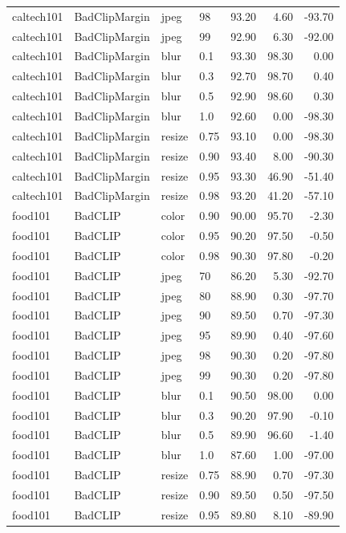 \begin{tabular}{llllrrr}
caltech101 & BadClipMargin & jpeg & 98 & 93.20 & 4.60 & -93.70 \\
caltech101 & BadClipMargin & jpeg & 99 & 92.90 & 6.30 & -92.00 \\
caltech101 & BadClipMargin & blur & 0.1 & 93.30 & 98.30 & 0.00 \\
caltech101 & BadClipMargin & blur & 0.3 & 92.70 & 98.70 & 0.40 \\
caltech101 & BadClipMargin & blur & 0.5 & 92.90 & 98.60 & 0.30 \\
caltech101 & BadClipMargin & blur & 1.0 & 92.60 & 0.00 & -98.30 \\
caltech101 & BadClipMargin & resize & 0.75 & 93.10 & 0.00 & -98.30 \\
caltech101 & BadClipMargin & resize & 0.90 & 93.40 & 8.00 & -90.30 \\
caltech101 & BadClipMargin & resize & 0.95 & 93.30 & 46.90 & -51.40 \\
caltech101 & BadClipMargin & resize & 0.98 & 93.20 & 41.20 & -57.10 \\
food101 & BadCLIP & color & 0.90 & 90.00 & 95.70 & -2.30 \\
food101 & BadCLIP & color & 0.95 & 90.20 & 97.50 & -0.50 \\
food101 & BadCLIP & color & 0.98 & 90.30 & 97.80 & -0.20 \\
food101 & BadCLIP & jpeg & 70 & 86.20 & 5.30 & -92.70 \\
food101 & BadCLIP & jpeg & 80 & 88.90 & 0.30 & -97.70 \\
food101 & BadCLIP & jpeg & 90 & 89.50 & 0.70 & -97.30 \\
food101 & BadCLIP & jpeg & 95 & 89.90 & 0.40 & -97.60 \\
food101 & BadCLIP & jpeg & 98 & 90.30 & 0.20 & -97.80 \\
food101 & BadCLIP & jpeg & 99 & 90.30 & 0.20 & -97.80 \\
food101 & BadCLIP & blur & 0.1 & 90.50 & 98.00 & 0.00 \\
food101 & BadCLIP & blur & 0.3 & 90.20 & 97.90 & -0.10 \\
food101 & BadCLIP & blur & 0.5 & 89.90 & 96.60 & -1.40 \\
food101 & BadCLIP & blur & 1.0 & 87.60 & 1.00 & -97.00 \\
food101 & BadCLIP & resize & 0.75 & 88.90 & 0.70 & -97.30 \\
food101 & BadCLIP & resize & 0.90 & 89.50 & 0.50 & -97.50 \\
food101 & BadCLIP & resize & 0.95 & 89.80 & 8.10 & -89.90 \\

\end{tabular}
